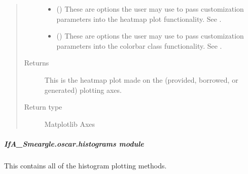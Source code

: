 \documentclass[letterpaper,10pt,english]{sphinxmanual}
\begin{document}
\begin{fulllineitems}
\begin{quote}
\begin{description}
\begin{itemize}
\item {} 
 () \textendash{} These are options the user may use to pass customization parameters
into the heatmap plot functionality.
See .

\item {} 
 () \textendash{} These are options the user may use to pass customization parameters
into the colorbar class functionality.
See .

\end{itemize}

\item[{Returns}] \leavevmode
{} \textendash{} This is the heatmap plot made on the (provided, borrowed, or
generated) plotting axes.

\item[{Return type}] \leavevmode
Matplotlib Axes

\end{description}\end{quote}

\end{fulllineitems}



\subparagraph{IfA\_Smeargle.oscar.histograms module}
\label{\detokenize{python_docstrings/IfA_Smeargle.oscar.histograms:module-IfA_Smeargle.oscar.histograms}}\label{\detokenize{python_docstrings/IfA_Smeargle.oscar.histograms:ifa-smeargle-oscar-histograms-module}}\label{\detokenize{python_docstrings/IfA_Smeargle.oscar.histograms::doc}}
This contains all of the histogram plotting methods.
\end{document}
